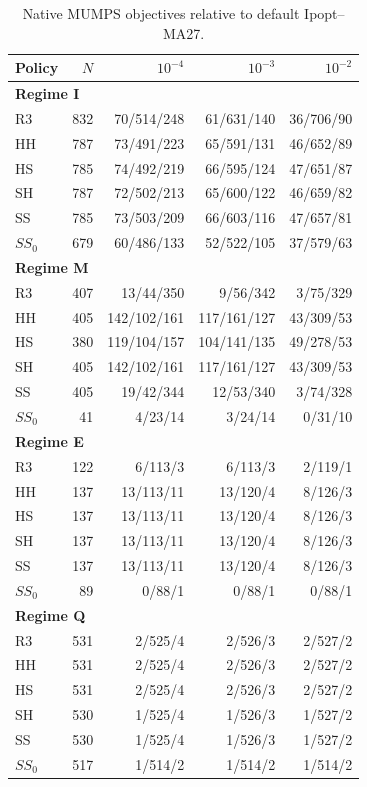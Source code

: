 \documentclass[pdflatex,sn-mathphys-num]{sn-jnl}
\theoremstyle{thmstyleone}
\theoremstyle{thmstylethree}
\begin{document}
\begin{table}[!htbp]
\centering\small
\caption{Native MUMPS objectives relative to default Ipopt--MA27.}
\label{tab:thresholds-native-mumps-ma27}

\begin{tabular}{lrrrr}
\toprule
Policy & $N$ & $10^{-4}$ & $10^{-3}$ & $10^{-2}$ \\
\midrule
\multicolumn{5}{l}{\textbf{Regime I}} \\
R3 & 832 & 70/514/248 & 61/631/140 & 36/706/90 \\
HH & 787 & 73/491/223 & 65/591/131 & 46/652/89 \\
HS & 785 & 74/492/219 & 66/595/124 & 47/651/87 \\
SH & 787 & 72/502/213 & 65/600/122 & 46/659/82 \\
SS & 785 & 73/503/209 & 66/603/116 & 47/657/81 \\
$SS_0$ & 679 & 60/486/133 & 52/522/105 & 37/579/63 \\
\midrule
\multicolumn{5}{l}{\textbf{Regime M}} \\
R3 & 407 & 13/44/350 & 9/56/342 & 3/75/329 \\
HH & 405 & 142/102/161 & 117/161/127 & 43/309/53 \\
HS & 380 & 119/104/157 & 104/141/135 & 49/278/53 \\
SH & 405 & 142/102/161 & 117/161/127 & 43/309/53 \\
SS & 405 & 19/42/344 & 12/53/340 & 3/74/328 \\
$SS_0$ & 41 & 4/23/14 & 3/24/14 & 0/31/10 \\
\midrule
\multicolumn{5}{l}{\textbf{Regime E}} \\
R3 & 122 & 6/113/3 & 6/113/3 & 2/119/1 \\
HH & 137 & 13/113/11 & 13/120/4 & 8/126/3 \\
HS & 137 & 13/113/11 & 13/120/4 & 8/126/3 \\
SH & 137 & 13/113/11 & 13/120/4 & 8/126/3 \\
SS & 137 & 13/113/11 & 13/120/4 & 8/126/3 \\
$SS_0$ & 89 & 0/88/1 & 0/88/1 & 0/88/1 \\
\midrule
\multicolumn{5}{l}{\textbf{Regime Q}} \\
R3 & 531 & 2/525/4 & 2/526/3 & 2/527/2 \\
HH & 531 & 2/525/4 & 2/526/3 & 2/527/2 \\
HS & 531 & 2/525/4 & 2/526/3 & 2/527/2 \\
SH & 530 & 1/525/4 & 1/526/3 & 1/527/2 \\
SS & 530 & 1/525/4 & 1/526/3 & 1/527/2 \\
$SS_0$ & 517 & 1/514/2 & 1/514/2 & 1/514/2 \\
\bottomrule
\end{tabular}


\end{table}
\end{document}

